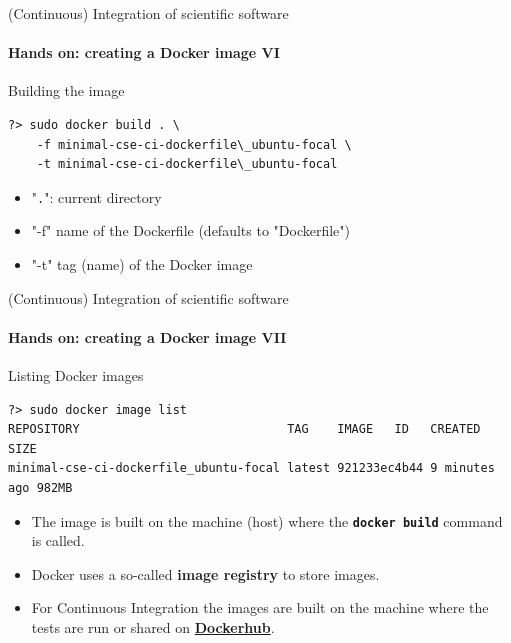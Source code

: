 \begin{frame}[fragile]{(Continuous) Integration of scientific software} 
    \framesubtitle{Hands on: creating a Docker image VI} 
    \vfill

    Building the image

\begin{verbatim}
?> sudo docker build . \
    -f minimal-cse-ci-dockerfile\_ubuntu-focal \
    -t minimal-cse-ci-dockerfile\_ubuntu-focal
\end{verbatim}

\begin{itemize}
    \item "\texttt{.}": current directory
    \item "-f" name of the Dockerfile (defaults to "Dockerfile")
    \item "-t" tag (name) of the Docker image
\end{itemize}

\end{frame}

\begin{frame}[fragile]{(Continuous) Integration of scientific software} 
    \framesubtitle{Hands on: creating a Docker image VII} 
    \vfill

    Listing Docker images

    \begin{verbatim}
?> sudo docker image list
REPOSITORY                             TAG    IMAGE   ID   CREATED        SIZE
minimal-cse-ci-dockerfile_ubuntu-focal latest 921233ec4b44 9 minutes ago 982MB
    \end{verbatim}

    \begin{itemize}
        \item The image is built on the machine (host) where the \textbf{\texttt{docker build}} command is called. 
        \item Docker uses a so-called \textbf{image registry} to store images.
        \item For Continuous Integration the images are built on the machine where the tests are run or shared on \href{https://hub.docker.com/}{\textbf{Dockerhub}}.
    \end{itemize}

\end{frame}

